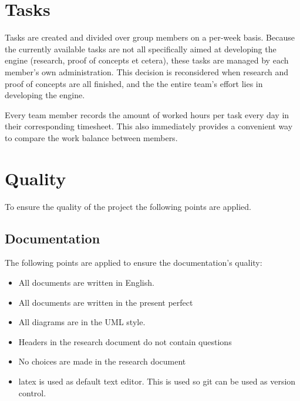 \documentclass{article} %
\begin{document}
\newpage

\section{Tasks}
Tasks are created and divided over group members on a per-week basis.
Because the currently available tasks are not all specifically aimed at developing the engine (research, proof of concepts et cetera), these tasks are managed by each member's own administration.
This decision is reconsidered when research and proof of concepts are all finished, and the the entire team's effort lies in developing the engine.

Every team member records the amount of worked hours per task every day in their corresponding timesheet. This also immediately provides a convenient way to compare the work balance between members.
\newpage

\section{Quality}
To ensure the quality of the project the following points are applied.
\subsection{Documentation}
The following points are applied to ensure the documentation’s quality:
\begin{itemize}
    \item All documents are written in English.
    \item All documents are written in the present perfect
    \item All diagrams are in the UML style.
    \item Headers in the research document do not contain questions
    \item No choices are made in the research document
    \item latex is used as default text editor. This is used so git can be used as version control.
\end{itemize}
\end{document}
